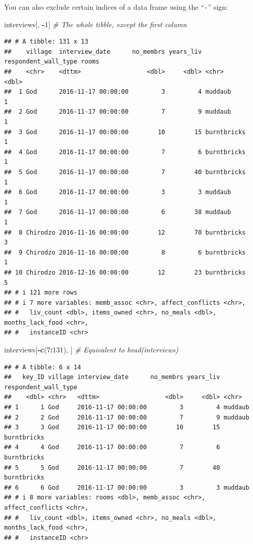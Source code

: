 \documentclass[
]{article}
\newenvironment{Shaded}{\begin{snugshade}}{\end{snugshade}}
\newcommand{\CommentTok}[1]{\textcolor[rgb]{0.56,0.35,0.01}{\textit{#1}}}
\newcommand{\DecValTok}[1]{\textcolor[rgb]{0.00,0.00,0.81}{#1}}
\newcommand{\FunctionTok}[1]{\textcolor[rgb]{0.13,0.29,0.53}{\textbf{#1}}}
\newcommand{\NormalTok}[1]{#1}
\newcommand{\SpecialCharTok}[1]{\textcolor[rgb]{0.81,0.36,0.00}{\textbf{#1}}}
\begin{document}
You can also exclude certain indices of a data frame using the
``\texttt{-}'' sign:

\begin{Shaded}
\begin{Highlighting}[]
\NormalTok{interviews[, }\SpecialCharTok{{-}}\DecValTok{1}\NormalTok{]          }\CommentTok{\# The whole tibble, except the first column}
\end{Highlighting}
\end{Shaded}

\begin{verbatim}
## # A tibble: 131 x 13
##    village  interview_date      no_membrs years_liv respondent_wall_type rooms
##    <chr>    <dttm>                  <dbl>     <dbl> <chr>                <dbl>
##  1 God      2016-11-17 00:00:00         3         4 muddaub                  1
##  2 God      2016-11-17 00:00:00         7         9 muddaub                  1
##  3 God      2016-11-17 00:00:00        10        15 burntbricks              1
##  4 God      2016-11-17 00:00:00         7         6 burntbricks              1
##  5 God      2016-11-17 00:00:00         7        40 burntbricks              1
##  6 God      2016-11-17 00:00:00         3         3 muddaub                  1
##  7 God      2016-11-17 00:00:00         6        38 muddaub                  1
##  8 Chirodzo 2016-11-16 00:00:00        12        70 burntbricks              3
##  9 Chirodzo 2016-11-16 00:00:00         8         6 burntbricks              1
## 10 Chirodzo 2016-12-16 00:00:00        12        23 burntbricks              5
## # i 121 more rows
## # i 7 more variables: memb_assoc <chr>, affect_conflicts <chr>,
## #   liv_count <dbl>, items_owned <chr>, no_meals <dbl>, months_lack_food <chr>,
## #   instanceID <chr>
\end{verbatim}

\begin{Shaded}
\begin{Highlighting}[]
\NormalTok{interviews[}\SpecialCharTok{{-}}\FunctionTok{c}\NormalTok{(}\DecValTok{7}\SpecialCharTok{:}\DecValTok{131}\NormalTok{), ]   }\CommentTok{\# Equivalent to head(interviews)}
\end{Highlighting}
\end{Shaded}

\begin{verbatim}
## # A tibble: 6 x 14
##   key_ID village interview_date      no_membrs years_liv respondent_wall_type
##    <dbl> <chr>   <dttm>                  <dbl>     <dbl> <chr>               
## 1      1 God     2016-11-17 00:00:00         3         4 muddaub             
## 2      2 God     2016-11-17 00:00:00         7         9 muddaub             
## 3      3 God     2016-11-17 00:00:00        10        15 burntbricks         
## 4      4 God     2016-11-17 00:00:00         7         6 burntbricks         
## 5      5 God     2016-11-17 00:00:00         7        40 burntbricks         
## 6      6 God     2016-11-17 00:00:00         3         3 muddaub             
## # i 8 more variables: rooms <dbl>, memb_assoc <chr>, affect_conflicts <chr>,
## #   liv_count <dbl>, items_owned <chr>, no_meals <dbl>, months_lack_food <chr>,
## #   instanceID <chr>
\end{verbatim}
\end{document}
